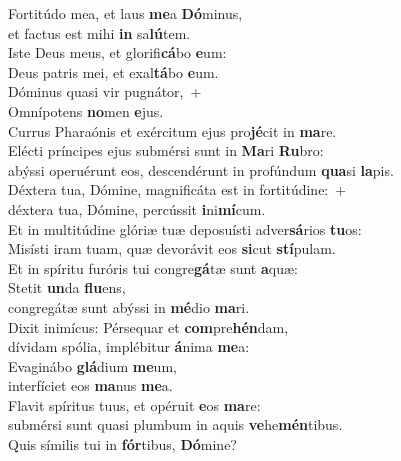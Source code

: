 \evenverse Fortitúdo mea, et laus \textbf{me}a \textbf{Dó}minus,~\*\\
\evenverse et factus est mihi \textbf{in} sa\textbf{lú}tem.\\
\oddverse Iste Deus meus, et glorifi\textbf{cá}bo \textbf{e}um:~\*\\
\oddverse Deus patris mei, et exal\textbf{tá}bo \textbf{e}um.\\
\evenverse Dóminus quasi vir pugnátor,~+\\
\evenverse  Omnípotens \textbf{no}men \textbf{e}jus.~\*\\
\evenverse Currus Pharaónis et exércitum ejus pro\textbf{jé}cit in \textbf{ma}re.\\
\oddverse Elécti príncipes ejus submérsi sunt in \textbf{Ma}ri \textbf{Ru}bro:~\*\\
\oddverse abýssi operuérunt eos, descendérunt in profúndum \textbf{qua}si \textbf{la}pis.\\
\evenverse Déxtera tua, Dómine, magnificáta est in fortitúdine:~+\\
\evenverse  déxtera tua, Dómine, percússit \textbf{i}ni\textbf{mí}cum.~\*\\
\evenverse Et in multitúdine glóriæ tuæ deposuísti adver\textbf{sá}rios \textbf{tu}os:\\
\oddverse Misísti iram tuam, quæ devorávit eos \textbf{si}cut \textbf{stí}pulam.~\*\\
\oddverse Et in spíritu furóris tui congre\textbf{gá}tæ sunt \textbf{a}quæ:\\
\evenverse Stetit \textbf{un}da \textbf{flu}ens,~\*\\
\evenverse congregátæ sunt abýssi in \textbf{mé}dio \textbf{ma}ri.\\
\oddverse Dixit inimícus: Pérsequar et \textbf{com}pre\textbf{hén}dam,~\*\\
\oddverse dívidam spólia, implébitur \textbf{á}nima \textbf{me}a:\\
\evenverse Evaginábo \textbf{glá}dium \textbf{me}um,~\*\\
\evenverse interfíciet eos \textbf{ma}nus \textbf{me}a.\\
\oddverse Flavit spíritus tuus, et opéruit \textbf{e}os \textbf{ma}re:~\*\\
\oddverse submérsi sunt quasi plumbum in aquis \textbf{ve}he\textbf{mén}tibus.\\
\evenverse Quis símilis tui in \textbf{fór}tibus, \textbf{Dó}mine?~\*\\
